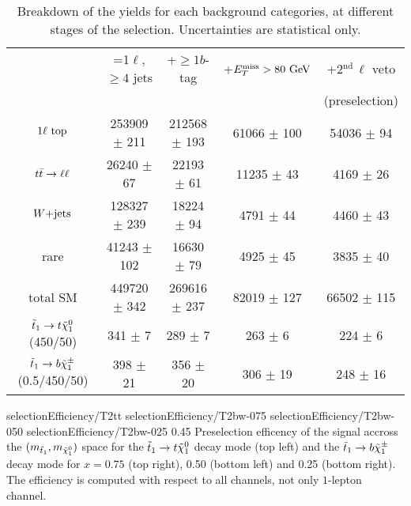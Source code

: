         \begin{table}[h!]
            \hspace*{-0.3cm}
            \begin{tabular}{|c|cccc|}
                \hline
                                             & =1$\ell$, $\geq 4$ jets   & +$\geq 1b$-tag     & +$E_T^\text{miss} > 80 ~\text{GeV}$ &  +2$^\text{nd}\, \ell$ veto \\
                                             &                           &                    &                   & (preselection) \\
                \hline                       
                $1\ell~\text{top}$              & 253909 $\pm$ 211          & 212568 $\pm$ 193   &  61066 $\pm$ 100  & 54036 $\pm$ 94     \\
                $t\bar{t} \rightarrow \ell \ell$               &  26240 $\pm$ 67           &  22193 $\pm$ 61    &  11235 $\pm$ 43   &  4169 $\pm$ 26     \\
                $\text{$W$+jets}$                     & 128327 $\pm$ 239          &  18224 $\pm$ 94    &   4791 $\pm$ 44   &  4460 $\pm$ 43     \\
                rare                         &  41243 $\pm$ 102          &  16630 $\pm$ 79    &   4925 $\pm$ 45   &  3835 $\pm$ 40     \\
                \hline                                                                        
                total SM                     & 449720 $\pm$ 342          & 269616 $\pm$ 237   &  82019 $\pm$ 127  & 66502 $\pm$ 115    \\
                \hline
$\tilde{t}_1 \rightarrow t \tilde{\chi}_1^0$   (450/50) & 341 $\pm$ 7               & 289 $\pm$ 7        & 263 $\pm$ 6       & 224 $\pm$ 6        \\ 
$\tilde{t}_1 \rightarrow b \tilde{\chi}_1^\pm$ (0.5/450/50) & 398 $\pm$ 21              & 356 $\pm$ 20       & 306 $\pm$ 19      & 248 $\pm$ 16       \\
                \hline
            \end{tabular}
            \caption{Breakdown of the yields for each background categories, at different stages of the selection. Uncertainties are statistical only.}
            \label{tab:cutflowPreselection}
        \end{table}

                          {selectionEfficiency/T2tt}
                          {selectionEfficiency/T2bw-075}
                          {selectionEfficiency/T2bw-050}
                          {selectionEfficiency/T2bw-025}
                          {0.45}
                          {Preselection efficency of the signal accross the $(m_{\tilde{t}_1},
                          m_{\tilde{\chi}_1^0})$ space for the $\tilde{t}_1 \rightarrow t \tilde{\chi}_1^0$ 
                          decay mode (top left) and the $\tilde{t}_1 \rightarrow b \tilde{\chi}_1^\pm$ 
                          decay mode for $x = 0.75$ (top right), 0.50 (bottom left) and 0.25 
                          (bottom right). The efficiency is computed with respect to all 
                          channels, not only $1$-lepton channel.}


